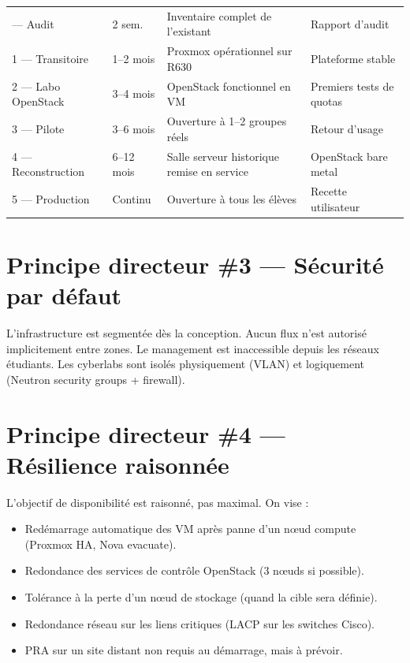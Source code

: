 \begin{xltabular}{\textwidth}{@{}llXl@{}}
\toprule
{} &  &  &  \\
\midrule
\endhead
\bottomrule
\endfoot
\bottomrule
{} — Audit & 2 sem. & Inventaire complet de l'existant & Rapport d'audit \\
1 — Transitoire & 1–2 mois & Proxmox opérationnel sur R630 & Plateforme stable \\
2 — Labo OpenStack & 3–4 mois & OpenStack fonctionnel en VM & Premiers tests de quotas \\
3 — Pilote & 3–6 mois & Ouverture à 1–2 groupes réels & Retour d'usage \\
4 — Reconstruction & 6–12 mois & Salle serveur historique remise en service & OpenStack bare metal \\
5 — Production & Continu & Ouverture à tous les élèves & Recette utilisateur \\

\end{xltabular}

\section{Principe directeur \#3 — Sécurité par défaut}
L'infrastructure est segmentée dès la conception. Aucun flux n'est autorisé implicitement entre zones. Le management est inaccessible depuis les réseaux étudiants. Les cyberlabs sont isolés physiquement (VLAN) et logiquement (Neutron security groups + firewall).

\section{Principe directeur \#4 — Résilience raisonnée}
L'objectif de disponibilité est raisonné, pas maximal. On vise :
\begin{itemize}
  \item Redémarrage automatique des VM après panne d'un nœud compute (Proxmox HA, Nova evacuate).
  \item Redondance des services de contrôle OpenStack (3 nœuds si possible).
  \item Tolérance à la perte d'un nœud de stockage (quand la cible sera définie).
  \item Redondance réseau sur les liens critiques (LACP sur les switches Cisco).
  \item PRA sur un site distant non requis au démarrage, mais à prévoir.
\end{itemize}

